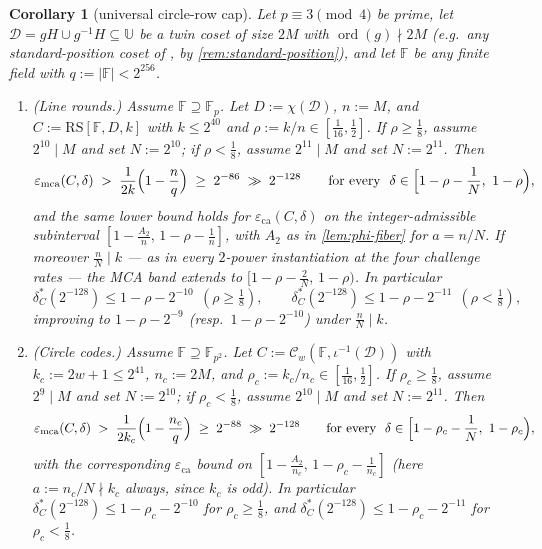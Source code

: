 \documentclass[11pt]{article}
\newtheorem{corollary}[corollary]{Corollary}
\theoremstyle{definition}
\theoremstyle{remark}
\newcommand{\F}{\mathbb{F}}
\newcommand{\RS}{\mathrm{RS}}
\newcommand{\eca}{\varepsilon_{\mathrm{ca}}}
\newcommand{\emca}{\varepsilon_{\mathrm{mca}}}
\newcommand{\UU}{\mathbb{U}}
\begin{document}
\begin{corollary}[universal circle-row cap]\label{cor:circle-grand}
Let $p\equiv3\pmod4$ be prime, let $\mathcal D=gH\cup g^{-1}H\subseteq\UU$ be a twin coset of size $2M$ with $\operatorname{ord}(g)\nmid2M$ \textup(e.g.\ any standard-position coset of \cite{HLP24}, by \cref{rem:standard-position}\textup), and let $\F$ be any finite field with $q:=|\F|<2^{256}$.
\begin{enumerate}[label=\textup{(\alph*)}]
\item \textup{(Line rounds.)} Assume $\F\supseteq\F_p$. Let $D:=\chi(\mathcal D)$, $n:=M$, and $C:=\RS[\F,D,k]$ with $k\le2^{40}$ and $\rho:=k/n\in[\tfrac1{16},\tfrac12]$. If $\rho\ge\frac18$, assume $2^{10}\mid M$ and set $N:=2^{10}$; if $\rho<\frac18$, assume $2^{11}\mid M$ and set $N:=2^{11}$. Then
\[
\emca(C,\delta)\;>\;\frac1{2k}\Bigl(1-\frac nq\Bigr)\;\ge\;2^{-86}\;\gg\;2^{-128}
\qquad\text{for every }\ \delta\in\Bigl[1-\rho-\frac1N,\ 1-\rho\Bigr),
\]
and the same lower bound holds for $\eca(C,\delta)$ on the integer-admissible subinterval $[1-\frac{A_2}n,\,1-\rho-\frac1n]$, with $A_2$ as in \cref{lem:phi-fiber} for $a=n/N$. If moreover $\frac nN\mid k$ --- as in every $2$-power instantiation at the four challenge rates --- the MCA band extends to $[1-\rho-\frac2N,\,1-\rho)$. In particular
\[
\delta^*_C(2^{-128})\le1-\rho-2^{-10}\ \ (\rho\ge\tfrac18),
\qquad
\delta^*_C(2^{-128})\le1-\rho-2^{-11}\ \ (\rho<\tfrac18),
\]
improving to $1-\rho-2^{-9}$ \textup(resp.\ $1-\rho-2^{-10}$\textup) under $\frac nN\mid k$.
\item \textup{(Circle codes.)} Assume $\F\supseteq\F_{p^2}$. Let $C:=\mathcal C_w(\F,\iota^{-1}(\mathcal D))$ with $k_c:=2w+1\le2^{41}$, $n_c:=2M$, and $\rho_c:=k_c/n_c\in[\tfrac1{16},\tfrac12]$. If $\rho_c\ge\frac18$, assume $2^{9}\mid M$ and set $N:=2^{10}$; if $\rho_c<\frac18$, assume $2^{10}\mid M$ and set $N:=2^{11}$. Then
\[
\emca(C,\delta)\;>\;\frac1{2k_c}\Bigl(1-\frac{n_c}q\Bigr)\;\ge\;2^{-88}\;\gg\;2^{-128}
\qquad\text{for every }\ \delta\in\Bigl[1-\rho_c-\frac1N,\ 1-\rho_c\Bigr),
\]
with the corresponding $\eca$ bound on $[1-\frac{A_2}{n_c},\,1-\rho_c-\frac1{n_c}]$ \textup(here $a:=n_c/N\nmid k_c$ always, since $k_c$ is odd\textup). In particular $\delta^*_C(2^{-128})\le1-\rho_c-2^{-10}$ for $\rho_c\ge\frac18$, and $\delta^*_C(2^{-128})\le1-\rho_c-2^{-11}$ for $\rho_c<\frac18$.
\end{enumerate}
\end{corollary}
\end{document}
